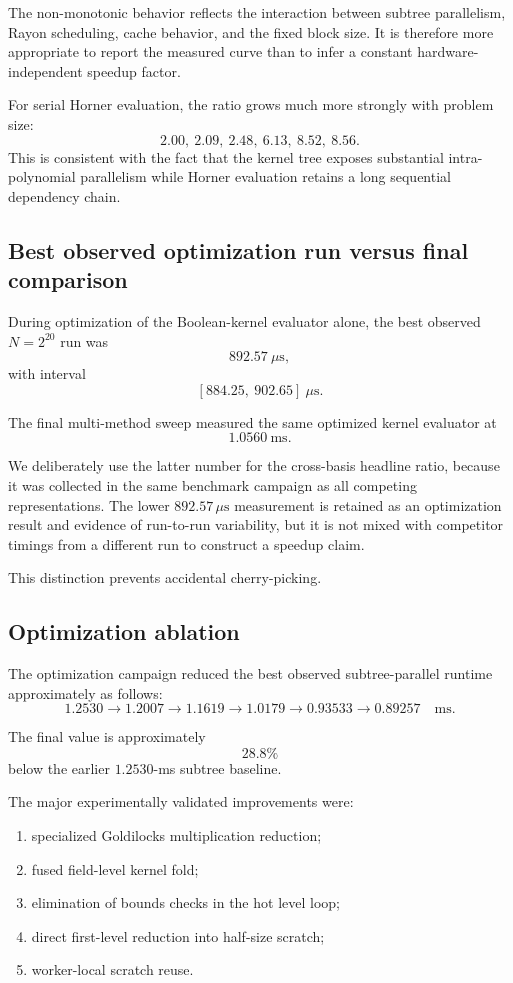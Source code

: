 The non-monotonic behavior reflects the interaction between subtree
parallelism, Rayon scheduling, cache behavior, and the fixed block size.
It is therefore more appropriate to report the measured curve than to
infer a constant hardware-independent speedup factor.

For serial Horner evaluation, the ratio grows much more strongly with
problem size:
\[
2.00,\ 2.09,\ 2.48,\ 6.13,\ 8.52,\ 8.56.
\]
This is consistent with the fact that the kernel tree exposes substantial
intra-polynomial parallelism while Horner evaluation retains a long
sequential dependency chain.

\subsection{Best observed optimization run versus final comparison}

During optimization of the Boolean-kernel evaluator alone, the best
observed \(N=2^{20}\) run was
\[
\boxed{892.57\ \mu\mathrm{s}},
\]
with interval
\[
[884.25,\ 902.65]\ \mu\mathrm{s}.
\]

The final multi-method sweep measured the same optimized kernel evaluator at
\[
1.0560\ \mathrm{ms}.
\]

We deliberately use the latter number for the cross-basis headline ratio,
because it was collected in the same benchmark campaign as all competing
representations.  The lower \(892.57\,\mu\mathrm{s}\) measurement is retained
as an optimization result and evidence of run-to-run variability, but it is
not mixed with competitor timings from a different run to construct a
speedup claim.

This distinction prevents accidental cherry-picking.

\subsection{Optimization ablation}

The optimization campaign reduced the best observed subtree-parallel runtime
approximately as follows:
\[
1.2530
\rightarrow
1.2007
\rightarrow
1.1619
\rightarrow
1.0179
\rightarrow
0.93533
\rightarrow
0.89257
\quad\mathrm{ms}.
\]

The final value is approximately
\[
28.8\%
\]
below the earlier \(1.2530\)-ms subtree baseline.

The major experimentally validated improvements were:

\begin{enumerate}
    \item specialized Goldilocks multiplication reduction;
    \item fused field-level kernel fold;
    \item elimination of bounds checks in the hot level loop;
    \item direct first-level reduction into half-size scratch;
    \item worker-local scratch reuse.
\end{enumerate}

